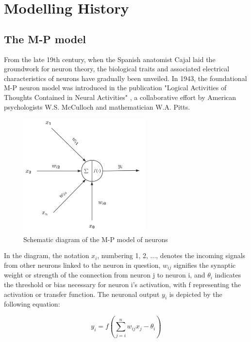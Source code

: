 \documentclass[12pt,a4paper]{report}
\begin{document}
\chapter{Modelling History}

\section{The M-P model}
From the late 19th century, when the Spanish anatomist Cajal laid the groundwork for neuron theory, the biological traits and associated electrical characteristics of neurons have gradually been unveiled. In 1943, the foundational M-P neuron model was introduced in the publication "Logical Activities of Thoughts Contained in Neural Activities" \cite{Mcculloch1854LOGICALCALCULUSIDEAS}, a collaborative effort by American psychologists W.S. McCulloch and mathematician W.A. Pitts.

\begin{figure}[H]
    \centering
    \includegraphics[width=0.6\textwidth]{./data/M-P.jpg}
    \caption{Schematic diagram of the M-P model of neurons}
    \label{fig:my_picture}
    \vspace{1pt} %
\end{figure}

In the diagram, the notation $x_i$, numbering 1, 2, ..., denotes the incoming signals from other neurons linked to the neuron in question, $w_{ij}$ signifies the synaptic weight or strength of the connection from neuron j to neuron i, and $\theta_i$ indicates the threshold or bias necessary for neuron i's activation, with f representing the activation or transfer function. The neuronal output $y_i$ is depicted by the following equation:

\begin{equation}
    y_i = f(\sum_{j=i}^{n} w_{ij}x_j-\theta_i)
\end{equation}
\end{document}
